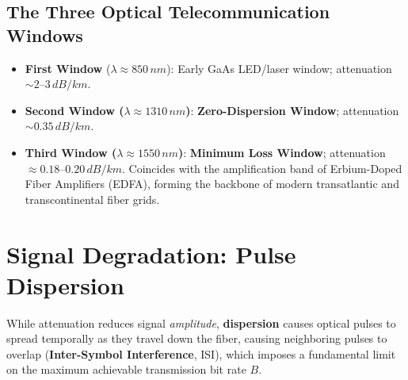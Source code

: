 \subsection{The Three Optical Telecommunication Windows}
\begin{itemize}
    \item \textbf{First Window} ($\lambda \approx 850\,\si{nm}$): Early GaAs LED/laser window; attenuation $\sim 2\text{--}3\,\si{dB/km}$.
    \item \textbf{Second Window ($\lambda \approx 1310\,\si{nm}$)}: \textbf{Zero-Dispersion Window}; attenuation $\sim 0.35\,\si{dB/km}$.
    \item \textbf{Third Window ($\lambda \approx 1550\,\si{nm}$)}: \textbf{Minimum Loss Window}; attenuation $\approx 0.18\text{--}0.20\,\si{dB/km}$. Coincides with the amplification band of Erbium-Doped Fiber Amplifiers (EDFA), forming the backbone of modern transatlantic and transcontinental fiber grids.
\end{itemize}

\section{Signal Degradation: Pulse Dispersion}

While attenuation reduces signal \textit{amplitude}, \textbf{dispersion} causes optical pulses to spread temporally as they travel down the fiber, causing neighboring pulses to overlap (\textbf{Inter-Symbol Interference}, ISI), which imposes a fundamental limit on the maximum achievable transmission bit rate $B$.

